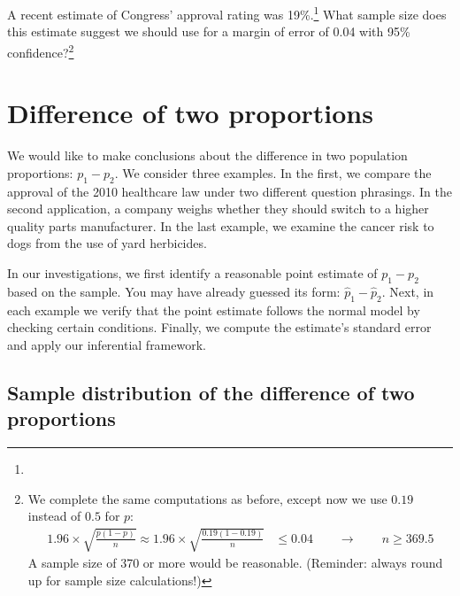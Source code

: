 \begin{exercise}
A recent estimate of Congress' approval rating was 19\%.\footnote{} What sample size does this estimate suggest we should use for a margin of error of 0.04 with 95\% confidence?\footnote{We complete the same computations as before, except now we use $0.19$ instead of $0.5$ for $p$:
\begin{align*}
1.96\times \sqrt{\frac{p(1-p)}{n}} \approx
1.96\times \sqrt{\frac{0.19(1-0.19)}{n}} &\leq 0.04 \qquad\to\qquad n \geq 369.5
\end{align*}
A sample size of 370 or more would be reasonable. (Reminder: always round up for sample size calculations!)}


\end{exercise}



\textC{\newpage}



\section{Difference of two proportions}
\label{differenceOfTwoProportions}

We would like to make conclusions about the difference in two population proportions: $p_1 - p_2$. We consider three examples. In the first, we compare the approval of the 2010 healthcare law under two different question phrasings. In the second application, a company weighs whether they should switch to a higher quality parts manufacturer. In the last example, we examine the cancer risk to dogs from the use of yard herbicides.

In our investigations, we first identify a reasonable point estimate of $p_1 - p_2$ based on the sample. You may have already guessed its form: $\hat{p}_1 - \hat{p}_2$. Next, in each example we verify that the point estimate follows the normal model by checking certain conditions. Finally, we compute the estimate's standard error and apply our inferential framework.


\subsection{Sample distribution of the difference of two proportions}

